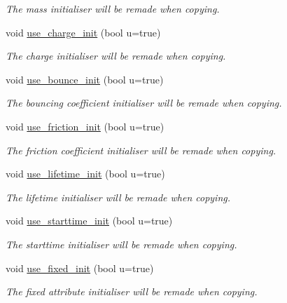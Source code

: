 \begin{DoxyCompactItemize}
\begin{DoxyCompactList}\small\item\em The mass initialiser will be remade when copying. \end{DoxyCompactList}\item 
void \hyperlink{classphysim_1_1init_1_1multisource_a4bc9fa90be0a91942071746743701edd}{use\+\_\+charge\+\_\+init} (bool u=true)
\begin{DoxyCompactList}\small\item\em The charge initialiser will be remade when copying. \end{DoxyCompactList}\item 
void \hyperlink{classphysim_1_1init_1_1multisource_a11d489afb2900b0ecec211e79dad14ef}{use\+\_\+bounce\+\_\+init} (bool u=true)
\begin{DoxyCompactList}\small\item\em The bouncing coefficient initialiser will be remade when copying. \end{DoxyCompactList}\item 
void \hyperlink{classphysim_1_1init_1_1multisource_aa4a00aa2fa625043ec0d20e2303758ed}{use\+\_\+friction\+\_\+init} (bool u=true)
\begin{DoxyCompactList}\small\item\em The friction coefficient initialiser will be remade when copying. \end{DoxyCompactList}\item 
void \hyperlink{classphysim_1_1init_1_1multisource_a45156cd3cd13cb4ebc4540fa56251cd5}{use\+\_\+lifetime\+\_\+init} (bool u=true)
\begin{DoxyCompactList}\small\item\em The lifetime initialiser will be remade when copying. \end{DoxyCompactList}\item 
void \hyperlink{classphysim_1_1init_1_1multisource_af15a42abe4b6c8f842731d288c4cf71f}{use\+\_\+starttime\+\_\+init} (bool u=true)
\begin{DoxyCompactList}\small\item\em The starttime initialiser will be remade when copying. \end{DoxyCompactList}\item 
void \hyperlink{classphysim_1_1init_1_1multisource_a58ee9fcd33be010bc6e4df0da14b39ae}{use\+\_\+fixed\+\_\+init} (bool u=true)
\begin{DoxyCompactList}\small\item\em The fixed attribute initialiser will be remade when copying. \end{DoxyCompactList}\item 

\end{DoxyCompactItemize}
